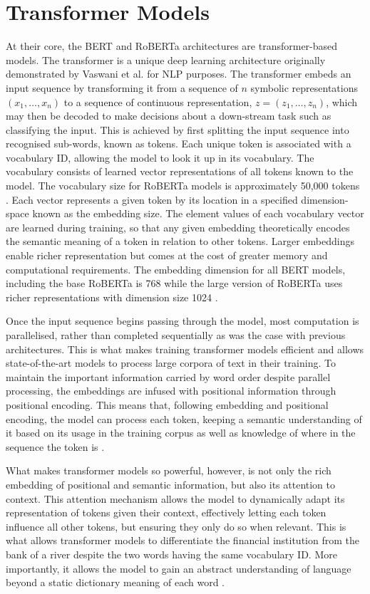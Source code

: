 \documentclass[12pt]{report}
\begin{document}
\chapter{Transformer Models}
\label{App: transformers}
At their core, the BERT and RoBERTa architectures are transformer-based models.
The transformer is a unique deep learning architecture originally demonstrated by Vaswani et al. \citeyear{Vaswani2017} for NLP purposes.
The transformer embeds an input sequence by transforming it from a sequence of $n$ symbolic representations $(x_1, \ldots, x_n)$ to a sequence of continuous representation, $z = (z_1, \ldots, z_n)$, which may then be decoded to make decisions about a down-stream task such as classifying the input.
This is achieved by first splitting the input sequence into recognised sub-words, known as tokens.
Each unique token is associated with a vocabulary ID, allowing the model to look it up in its vocabulary.
The vocabulary consists of learned vector representations of all tokens known to the model.
The vocabulary size for RoBERTa models is approximately 50,000 tokens \cite{roberta}.
Each vector represents a given token by its location in a specified dimension-space known as the embedding size.
The element values of each vocabulary vector are learned during training, so that any given embedding theoretically encodes the semantic meaning of a token in relation to other tokens.
Larger embeddings enable richer representation but comes at the cost of greater memory and computational requirements.
The embedding dimension for all BERT models, including the base RoBERTa is 768 while the large version of RoBERTa uses richer representations with dimension size 1024 \cite{BERT,roberta}.

Once the input sequence begins passing through the model, most computation is parallelised, rather than completed sequentially as was the case with previous architectures.
This is what makes training transformer models efficient and allows state-of-the-art models to process large corpora of text in their training.
To maintain the important information carried by word order despite parallel processing, the embeddings are infused with positional information through positional encoding.
This means that, following embedding and positional encoding, the model can process each token, keeping a semantic understanding of it based on its usage in the training corpus as well as knowledge of where in the sequence the token is \cite{Vaswani2017}.

What makes transformer models so powerful, however, is not only the rich embedding of positional and semantic information, but also its attention to context.
This attention mechanism allows the model to dynamically adapt its representation of tokens given their context, effectively letting each token influence all other tokens, but ensuring they only do so when relevant.
This is what allows transformer models to differentiate the financial institution from the bank of a river despite the two words having the same vocabulary ID.
More importantly, it allows the model to gain an abstract understanding of language beyond a static dictionary meaning of each word \cite{Vaswani2017}.
\end{document}
